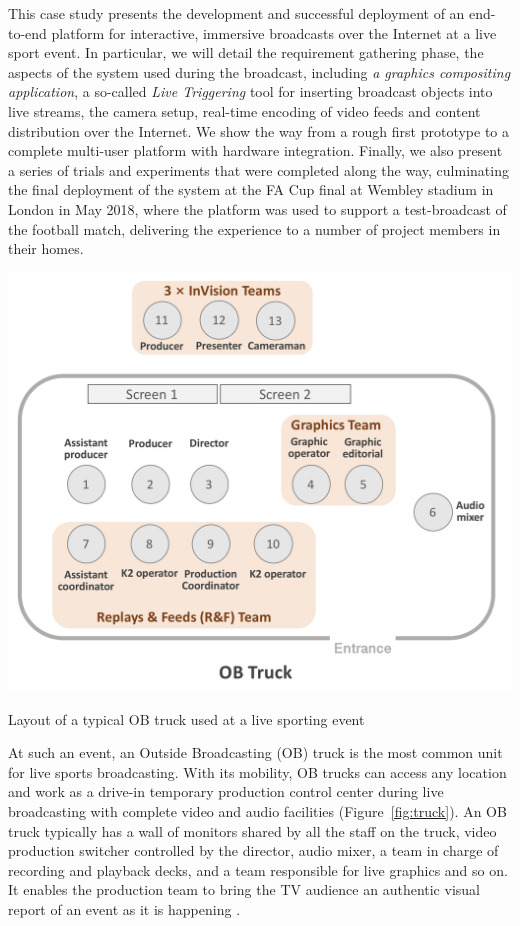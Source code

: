 \documentclass[sigchi-a, authorversion]{acmart}
\begin{document}
 This case study presents the development and successful deployment of an
 end-to-end platform for interactive, immersive broadcasts over the Internet at
 a live sport event. In particular, we will detail the requirement gathering phase,
 the aspects of the system used during the broadcast, including \emph{a graphics compositing
 application}, a so-called \emph{Live Triggering} tool for inserting broadcast objects
 into live streams, the camera setup, real-time encoding of video feeds and content
 distribution over the Internet.
 We show the way from a rough first prototype to a complete multi-user platform
 with hardware integration. Finally, we also present a series of trials and
 experiments that were completed along the way, culminating the final
 deployment of the system at the FA Cup final at Wembley stadium in London in
 May 2018, where the platform was used to support a test-broadcast of the
 football match, delivering the experience to a number of project members in their homes.

\begin{marginfigure}
    \vspace{-17pc}
    \includegraphics[width=\marginparwidth]{Figures/OBTruck.png}
    \caption{Layout of a typical OB truck used at a live sporting event}
    \label{fig:truck}
\end{marginfigure}

At such an event, an Outside Broadcasting (OB) truck is the most common unit for live sports
broadcasting. With its mobility, OB trucks can access any location and work as
a drive-in temporary production control center during live broadcasting with
complete video and audio facilities (Figure~\ref{fig:truck}). An OB truck typically has a wall of monitors
shared by all the staff on the truck, video production switcher controlled by
the director, audio mixer, a team in charge of recording and playback decks, and
a team responsible for live graphics and so on. It enables the production team
to bring the TV audience an authentic visual report of an event as it is
happening \cite{owens2012, owens2015}.
\end{document}
